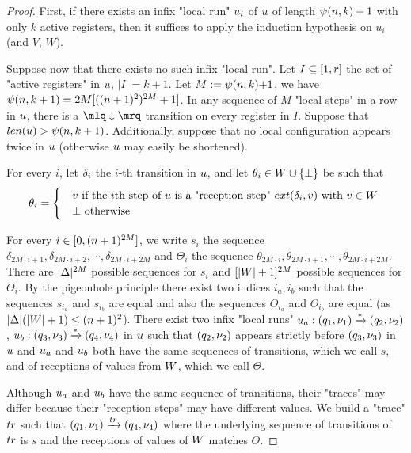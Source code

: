 \begin{proof}
	First, if there exists an infix "local run" $u_i$ of $u$ of length $\psi(n,k)+1$ with only $k$ active registers, then it suffices to apply the induction hypothesis on $u_i$ (and $V$, $W$).
	
	Suppose now that there exists no such infix "local run".
	Let $I \subseteq [1,r]$ the set of "active registers" in $u$, $|I| = k+1$. Let $M:= \psi(n,k){+}1$, we have $\psi(n,k+1) = 2M [((n+1)^2)^{2M}+1]$. 
	In any sequence of $M$ "local steps" in a row in $u$, 
	there is a $\quotemarks{\enregact}$ transition on every register in $I$. Suppose that $\length{\localrun} > \towerfun(n,k+1)$. Additionally, suppose that  no local configuration appears twice in $u$ (otherwise $u$ may easily be shortened). 
	
	
	For every $i$, let $\delta_i$ the $i$-th transition in $u$, and let $\theta_i\in W \cup \{\bot\}$ be such that 
	\[
	\theta_i = 
	\begin{cases}
		& 	v \text{ if the $i$th step of $u$ is a "reception step" $\extlabel{\delta_i}{v}$ with $v \in \Vinit$ } \\ 
		& 	\bot \text{ otherwise}
	\end{cases}
	\]

	For every $i \in [0,(n+1)^{2M}]$, we write $s_i$ the sequence $\delta_{2  M \cdot i+1}, \delta_{2  M \cdot i+2}, \cdots, \delta_{2 M \cdot i+2M}$ and $\Theta_i$ the sequence $\theta_{2  M \cdot i}, \theta_{2 M \cdot i+1}, \cdots, \theta_{2 M \cdot i+2M}$.
	There are $|\Delta|^{2M}$ possible sequences for $s_i$ and $[|W| +1]^{2M}$ possible sequences for $\Theta_i$.
	By the pigeonhole principle there exist two indices $i_a, i_b$ such that the sequences $s_{i_a}$ and $s_{i_b}$ are equal and also the sequences $\Theta_{i_a}$ and $\Theta_{i_b}$ are equal (as $|\Delta| (|W|+1) \leq (n+1)^2$). 
	There exist two infix "local runs" $u_a: (q_1, \nu_1) \xrightarrow{*} (q_2, \nu_2)$, $u_b: (q_3, \nu_3) \xrightarrow{*} (q_4, \nu_4)$ in $u$ such that $(q_2,\nu_2)$ appears strictly before $(q_3,\nu_3)$ in $u$ and $u_a$ and $u_b$ both have the same sequences of transitions, which we call $s$, and of receptions of values from $W$, which we call $\Theta$.
	
	Although $u_a$ and $u_b$ have the same sequence of transitions, their "traces" may differ because their "reception steps" may have different values.
	We build a "trace" $\atrace$ such that $(q_1,\localdata_1) \step{\atrace} (q_4, \localdata_4)$ where the underlying sequence of transitions of $\atrace$ is $s$ and the receptions of values of $W$ matches $\Theta$.
	

\end{proof}
